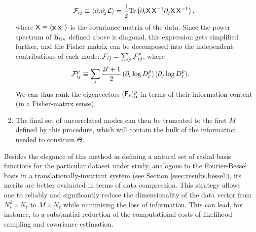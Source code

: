 \documentclass[twocolumn,amsfont,amssymb,amsmath, showpacs,balancelastpage, nofootinbib]{revtex4-1}
\begin{document}
\begin{enumerate}
        \begin{equation}
          {\cal F}_{ij}\equiv\left\langle\partial_i\partial_j{\cal L}\right\rangle=\frac{1}{2}{\rm Tr}\left(\partial_i{\sf X}\,{\sf X}^{-1}\partial_j{\sf X}\,{\sf X}^{-1}\right),
        \end{equation}
        where ${\sf X}\equiv\langle {\bf x}\,{\bf x}^\dag\rangle$ is the covariance matrix of the data. Since the power spectrum of ${\bf b}_{\ell m}$ defined above is diagonal, this expression gets simplified further, and the Fisher matrix can be decomposed into the independent contributions of each mode: ${\cal F}_{ij}=\sum_p {\cal F}^p_{ij}$, where
        \begin{align}
          {\cal F}^p_{ij}&\equiv\sum_\ell\frac{2\ell+1}{2}\,(\partial_i\log D^p_\ell)\,(\partial_j\log D^p_\ell).
        \end{align}
        We can thus rank the eigenvectors $({\sf F}_\ell)^p_\alpha$ in terms of their information content (in a Fisher-matrix sense).
        \item The final set of uncorrelated modes can then be truncated to the first $M$ defined by this procedure, which will contain the bulk of the information needed to constrain $\Theta$.
    \end{enumerate}
    Besides the elegance of this method in defining a natural set of radial basis functions for the particular dataset under study, analogous to the Fourier-Bessel basis in a translationally-invariant system (see Section \ref{ssec:results.bessel}), its merits are better evaluated in terms of data compression. This strategy allows one to reliably and significantly reduce the dimensionality of the data vector from $N_s^2\times N_\ell$ to $M\times N_\ell$ while minimising the loss of information. This can lead, for instance, to a substantial reduction of the computational costs of likelihood sampling and covariance estimation.
    
\end{document}

